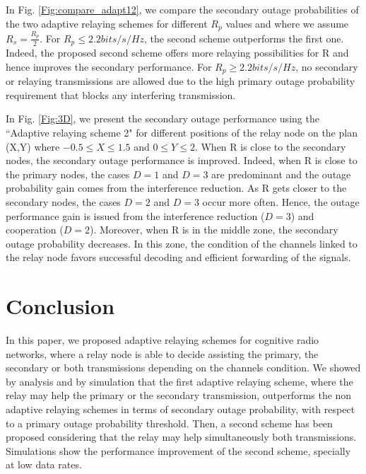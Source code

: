\documentclass[conference,twocolumn]{IEEEtran}
\begin{document}
In Fig. \ref{Fig:compare_adapt12}, we compare the secondary outage probabilities of the two adaptive relaying schemes for different $R_p$ values and where we assume $R_s=\frac{R_p}{2}$. For $R_p \leq 2.2 bits/s/Hz$, the second scheme outperforms the first one. Indeed, the proposed second scheme offers more relaying possibilities for R and hence improves the secondary performance. For $R_p \geq 2.2 bits/s/Hz$, no secondary or relaying transmissions are allowed due to the high primary outage probability requirement that blocks any interfering transmission.


In Fig. \ref{Fig:3D}, we present the secondary outage performance using the
``Adaptive relaying scheme 2" for different positions of the relay
node on the plan (X,Y) where $-0.5 \leq X \leq 1.5$ and $0 \leq Y
\leq 2$. When R is close to the secondary nodes, the secondary outage performance is improved. Indeed, when R is close to the primary nodes, the cases $D=1$ and $D=3$ are predominant and the outage probability gain comes from the interference reduction. As R gets closer to the secondary nodes, the cases $D=2$ and $D=3$ occur more often. Hence, the outage performance gain is issued from the interference reduction ($D=3$) and cooperation ($D=2$). Moreover, when R is in the middle zone, the secondary outage probability decreases. In this zone, the condition of the channels linked to the relay node favors successful decoding and efficient forwarding of the signals.


\section{Conclusion}
In this paper, we proposed adaptive relaying schemes for cognitive radio networks, where a relay node is able to decide assisting the primary, the secondary or both transmissions depending on the channels condition. We showed by analysis and by simulation that the first adaptive relaying scheme, where the relay may help the primary or the secondary transmission, outperforms the non adaptive relaying schemes in terms of secondary outage probability, with respect to a primary outage probability threshold. Then, a second scheme has been proposed considering that the relay may help simultaneously both transmissions. Simulations show the performance improvement of the second scheme, specially at low data rates.


\appendices
\end{document}
